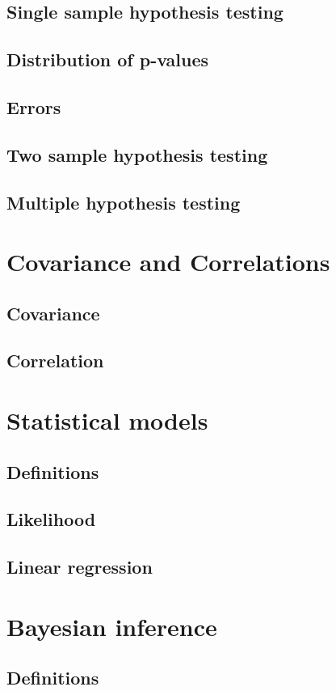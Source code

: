 \documentclass[../Year1/Year1.tex]{subfiles}
\begin{document}
\subsection{Single sample hypothesis testing}
\subsection{Distribution of p-values}
\subsection{Errors}
\subsection{Two sample hypothesis testing}
\subsection{Multiple hypothesis testing}
\section{Covariance and Correlations}
\subsection{Covariance}
\subsection{Correlation}
\section{Statistical models}
\subsection{Definitions}
\subsection{Likelihood}
\subsection{Linear regression}
\section{Bayesian inference}
\subsection{Definitions}
\end{document}
